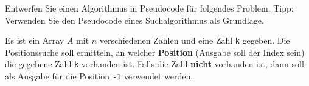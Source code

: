 %
%
Entwerfen Sie einen Algorithmus in Pseudocode für folgendes Problem. Tipp: Verwenden Sie den Pseudocode eines Suchalgorithmus als Grundlage.

\begin{problem}\label{problem-positionssuche-n-zahlen}
Es ist ein Array $A$ mit $n$ verschiedenen Zahlen und eine Zahl \lstinline[language=pseudocode]{k} gegeben. Die Positionssuche soll ermitteln, an welcher \textbf{Position} (Ausgabe soll der Index sein) die gegebene Zahl \lstinline[language=pseudocode]{k} vorhanden ist. Falls die Zahl \textbf{nicht} vorhanden ist, dann soll als Ausgabe für die Position \lstinline[language=pseudocode]{-1} verwendet werden.
\end{problem}


